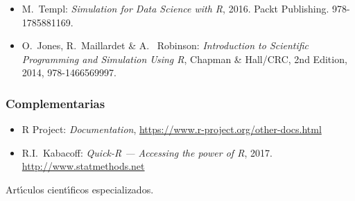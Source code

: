 \documentclass[10 pt]{article}
\begin{document}
\begin{itemize}[itemsep=0em]
  
\item{M.\ {\sc Templ}: {\em Simulation for Data Science with R},
    2016. Packt Publishing. 978-1785881169.}
  
\item{O.\ {\sc Jones}, R.\ {\sc Maillardet} \& A.\ {\sc
      Robinson}: {\em Introduction to Scientific Programming and
      Simulation Using R}, Chapman \& Hall/CRC, 2nd Edition, 2014,
    978-1466569997.}
  
\end{itemize}

\subsubsection{Complementarias}

\begin{itemize}[itemsep=0em]
  
\item{{\sc R Project}: {\em Documentation}, \url{https://www.r-project.org/other-docs.html}}
  
\item{R.I.\ {\sc Kabacoff}: {\em Quick-R --- Accessing the power of R}, 2017. \url{http://www.statmethods.net}}
  
\end{itemize}

Art\'{\i}culos cient\'{\i}ficos especializados.

\label{final} %


\end{document}
